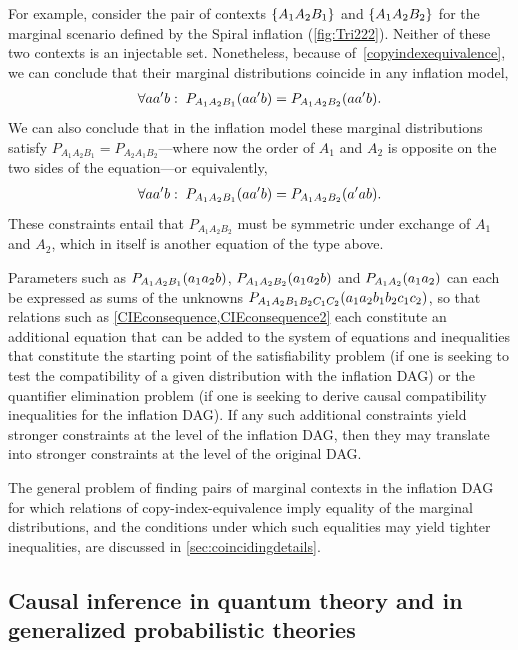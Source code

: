\documentclass[aps,english,superscriptaddress,onecolumn,twoside,longbibliography,pra,floatfix,fleqn,nofootinbib]{revtex4-1}%
\theoremstyle{definition}
\newcounter{example}[section]
\newcommand{\p}[2][]{{P_{#1}}\parenths{#2}}
\DeclarePairedDelimiter{\parenths}{\lparen}{\rparen}
\DeclarePairedDelimiter{\braces}{\lbrace}{\rbrace}
\newcommand{\brackets}[1]{\braces*{#1}}
\begin{document}
For example, consider the pair of contexts $\brackets{A_1 A_2 B_1}$ and $\brackets{A_1 A_2 B_2}$ for the marginal scenario defined by the Spiral inflation (\cref{fig:Tri222}). Neither of these two contexts is an injectable set.  Nonetheless, because of~\cref{copyindexequivalence}, we can conclude that their marginal distributions coincide in any inflation model,
\begin{align}\label{CIEconsequence}
\forall{a a' b}:\;\p[A_1 A_2 B_1]{a a' b} = \p[A_1 A_2 B_2]{a a' b}.
\end{align}
We can also conclude that in the inflation model these marginal distributions satisfy  $P_{A_1 A_2 B_1}=P_{A_2 A_1 B_2}$---where now the order of $A_1$ and $A_2$ is opposite on the two sides of the equation---or equivalently, 
\begin{align}\label{CIEconsequence2}
\forall{a a' b}:\;\p[A_1 A_2 B_1]{a a' b} = \p[A_1 A_2 B_2]{a' a b}.
\end{align}
These constraints entail that $P_{A_1 A_2 B_2}$ must be symmetric under exchange of $A_1$ and $A_2$, which in itself is another equation of the type above.

Parameters such as $\p[A_1 A_2 B_1]{a_1 a_2 b}$, $\p[A_1 A_2 B_2]{a_1 a_2 b}$ and $\p[A_1 A_2]{a_1 a_2}$ can each be expressed as sums of the unknowns $\p[A_1 A_2 B_1 B_2 C_1 C_2]{a_1 a_2 b_1 b_2 c_1 c_2}$, so that relations such as \cref{CIEconsequence,CIEconsequence2} each constitute an additional equation that can be added to the system of equations and inequalities that constitute the starting point of the satisfiability problem (if one is seeking to test the compatibility of a given distribution with the inflation DAG) or the quantifier elimination problem (if one is seeking to derive causal compatibility inequalities for the inflation DAG).  If any such additional constraints yield stronger constraints at the level of the inflation DAG, then they may translate into stronger constraints at the level of the original DAG.

The general problem of finding pairs of marginal contexts in the inflation DAG for which relations of copy-index-equivalence imply equality of the marginal distributions, and the conditions under which such equalities may yield tighter inequalities, are discussed in \cref{sec:coincidingdetails}.


\subsection{Causal inference in quantum theory and in generalized probabilistic theories}
\label{sec:classicallity}
\end{document}
